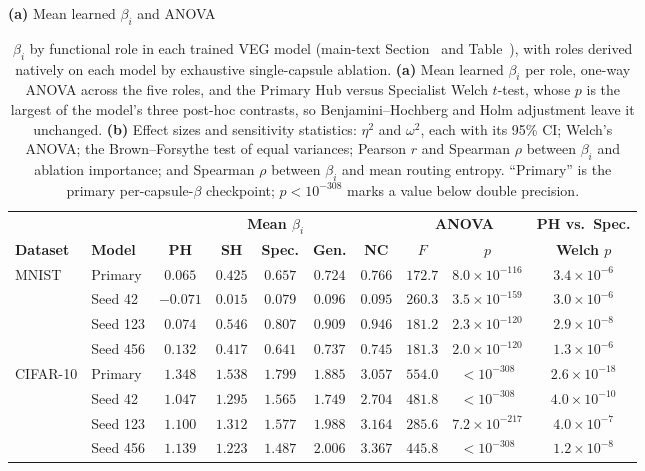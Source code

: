 \begin{table}[!htbp]
    \centering
    \caption{$\beta_i$ by functional role in each trained VEG model (main-text Section~\MainSecVegMechanism{} and Table~\MainTabGates), with roles derived natively on each model by exhaustive single-capsule ablation. \textbf{(a)} Mean learned $\beta_i$ per role, one-way ANOVA across the five roles, and the Primary Hub versus Specialist Welch $t$-test, whose $p$ is the largest of the model's three post-hoc contrasts, so Benjamini--Hochberg and Holm adjustment leave it unchanged. \textbf{(b)} Effect sizes and sensitivity statistics: $\eta^2$ and $\omega^2$, each with its 95\% CI; Welch's ANOVA; the Brown--Forsythe test of equal variances; Pearson $r$ and Spearman $\rho$ between $\beta_i$ and ablation importance; and Spearman $\rho$ between $\beta_i$ and mean routing entropy. ``Primary'' is the primary per-capsule-$\beta$ checkpoint; $p < 10^{-308}$ marks a value below double precision.}
    \label{tabS:beta_by_role}
    \scriptsize
    \setlength{\tabcolsep}{3.5pt}
    \textbf{(a)} Mean learned $\beta_i$ and ANOVA\\[2pt]
    \begin{tabular}{@{}llccccccc c@{}}
        \toprule
        & & \multicolumn{5}{c}{\textbf{Mean $\beta_i$}} & \multicolumn{2}{c}{\textbf{ANOVA}} & \textbf{PH vs.\ Spec.} \\
        \cmidrule(lr){3-7}\cmidrule(lr){8-9}
        \textbf{Dataset} & \textbf{Model} & \textbf{PH} & \textbf{SH} & \textbf{Spec.} & \textbf{Gen.} & \textbf{NC} & \textbf{$F$} & \textbf{$p$} & \textbf{Welch $p$} \\
        \midrule
        \multirow{4}{*}{MNIST} & Primary & $0.065$ & $0.425$ & $0.657$ & $0.724$ & $0.766$ & $172.7$ & $8.0\times10^{-116}$ & $3.4\times10^{-6}$ \\
         & Seed 42 & $-0.071$ & $0.015$ & $0.079$ & $0.096$ & $0.095$ & $260.3$ & $3.5\times10^{-159}$ & $3.0\times10^{-6}$ \\
         & Seed 123 & $0.074$ & $0.546$ & $0.807$ & $0.909$ & $0.946$ & $181.2$ & $2.3\times10^{-120}$ & $2.9\times10^{-8}$ \\
         & Seed 456 & $0.132$ & $0.417$ & $0.641$ & $0.737$ & $0.745$ & $181.3$ & $2.0\times10^{-120}$ & $1.3\times10^{-6}$ \\
        \midrule
        \multirow{4}{*}{CIFAR-10} & Primary & $1.348$ & $1.538$ & $1.799$ & $1.885$ & $3.057$ & $554.0$ & $<10^{-308}$ & $2.6\times10^{-18}$ \\
         & Seed 42 & $1.047$ & $1.295$ & $1.565$ & $1.749$ & $2.704$ & $481.8$ & $<10^{-308}$ & $4.0\times10^{-10}$ \\
         & Seed 123 & $1.100$ & $1.312$ & $1.577$ & $1.988$ & $3.164$ & $285.6$ & $7.2\times10^{-217}$ & $4.0\times10^{-7}$ \\
         & Seed 456 & $1.139$ & $1.223$ & $1.487$ & $2.006$ & $3.367$ & $445.8$ & $<10^{-308}$ & $1.2\times10^{-8}$ \\
        \bottomrule
    \end{tabular}


\end{table}
